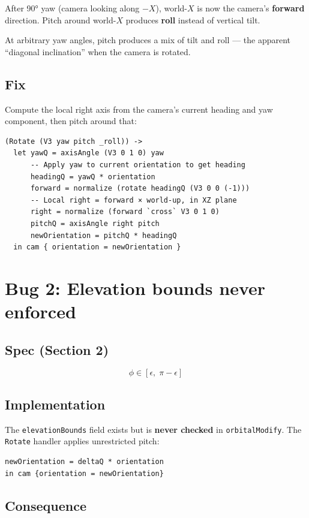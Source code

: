 \documentclass{article}
\begin{document}
After 90° yaw (camera looking along $-X$), world-$X$ is now the camera's
\textbf{forward} direction. Pitch around world-$X$ produces \textbf{roll}
instead of vertical tilt.

At arbitrary yaw angles, pitch produces a mix of tilt and roll — the apparent
``diagonal inclination'' when the camera is rotated.

\subsection{Fix}

Compute the local right axis from the camera's current heading and yaw
component, then pitch around that:

\begin{verbatim}
(Rotate (V3 yaw pitch _roll)) ->
  let yawQ = axisAngle (V3 0 1 0) yaw
      -- Apply yaw to current orientation to get heading
      headingQ = yawQ * orientation
      forward = normalize (rotate headingQ (V3 0 0 (-1)))
      -- Local right = forward × world-up, in XZ plane
      right = normalize (forward `cross` V3 0 1 0)
      pitchQ = axisAngle right pitch
      newOrientation = pitchQ * headingQ
  in cam { orientation = newOrientation }
\end{verbatim}

\section{Bug 2: Elevation bounds never enforced}

\subsection{Spec (Section 2)}

\[
\phi \in [\epsilon,\; \pi - \epsilon]
\]

\subsection{Implementation}

The \texttt{elevationBounds} field exists but is \textbf{never checked} in
\texttt{orbitalModify}. The \texttt{Rotate} handler applies unrestricted pitch:

\begin{verbatim}
newOrientation = deltaQ * orientation
in cam {orientation = newOrientation}
\end{verbatim}

\subsection{Consequence}
\end{document}
